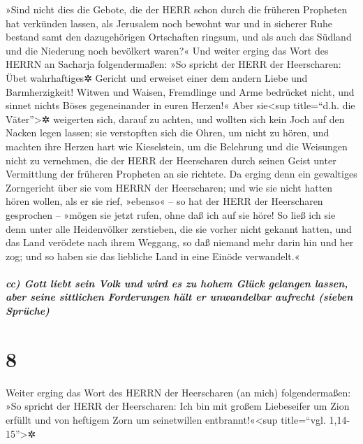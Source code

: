  »Sind nicht dies die Gebote, die der HERR schon durch die
früheren Propheten hat verkünden lassen, als Jerusalem noch bewohnt war
und in sicherer Ruhe bestand samt den dazugehörigen Ortschaften ringsum,
und als auch das Südland und die Niederung noch bevölkert waren?«
 Und weiter erging das Wort des HERRN an Sacharja
folgendermaßen:  »So spricht der HERR der Heerscharen:
Übet wahrhaftiges✲ Gericht und erweiset einer dem andern Liebe und
Barmherzigkeit!  Witwen und Waisen, Fremdlinge und Arme
bedrücket nicht, und sinnet nichts Böses gegeneinander in euren Herzen!«
 Aber sie\textless sup title=``d.h. die
Väter''\textgreater✲ weigerten sich, darauf zu achten, und wollten sich
kein Joch auf den Nacken legen lassen; sie verstopften sich die Ohren,
um nicht zu hören,  und machten ihre Herzen hart wie
Kieselstein, um die Belehrung und die Weisungen nicht zu vernehmen, die
der HERR der Heerscharen durch seinen Geist unter Vermittlung der
früheren Propheten an sie richtete. Da erging denn ein gewaltiges
Zorngericht über sie vom HERRN der Heerscharen;  und wie
sie nicht hatten hören wollen, als er sie rief, »ebenso« -- so hat der
HERR der Heerscharen gesprochen -- »mögen sie jetzt rufen, ohne daß ich
auf sie höre!  So ließ ich sie denn unter alle
Heidenvölker zerstieben, die sie vorher nicht gekannt hatten, und das
Land verödete nach ihrem Weggang, so daß niemand mehr darin hin und her
zog; und so haben sie das liebliche Land in eine Einöde verwandelt.«

\hypertarget{cc-gott-liebt-sein-volk-und-wird-es-zu-hohem-gluxfcck-gelangen-lassen-aber-seine-sittlichen-forderungen-huxe4lt-er-unwandelbar-aufrecht-sieben-spruxfcche}{%
\subparagraph{cc) Gott liebt sein Volk und wird es zu hohem Glück
gelangen lassen, aber seine sittlichen Forderungen hält er unwandelbar
aufrecht (sieben
Sprüche)}\label{cc-gott-liebt-sein-volk-und-wird-es-zu-hohem-gluxfcck-gelangen-lassen-aber-seine-sittlichen-forderungen-huxe4lt-er-unwandelbar-aufrecht-sieben-spruxfcche}}

\hypertarget{section-7}{%
\section{8}\label{section-7}}

 Weiter erging das Wort des HERRN der Heerscharen (an
mich) folgendermaßen:  »So spricht der HERR der
Heerscharen: Ich bin mit großem Liebeseifer um Zion erfüllt und von
heftigem Zorn um seinetwillen entbrannt!«\textless sup title=``vgl.
1,14-15''\textgreater✲

